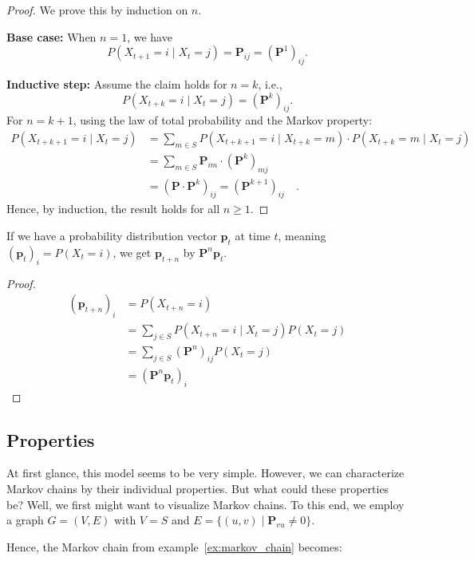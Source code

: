 \documentclass[../../main.tex]{subfiles}
\begin{document}
\begin{proof}
We prove this by induction on \( n \).

\textbf{Base case:} When \( n = 1 \), we have
\[
    P(X_{t+1} = i \mid X_t = j) = \bm{P}_{ij} = (\bm{P}^1)_{ij}.
\]

\textbf{Inductive step:} Assume the claim holds for \( n = k \), i.e.,
\[
    P(X_{t+k} = i \mid X_t = j) = (\bm{P}^k)_{ij}.
\]
For \( n = k+1 \), using the law of total probability and the Markov property:
\begin{align*}
    P(X_{t+k+1} = i \mid X_t = j) &= \sum_{m \in S} P(X_{t+k+1} = i \mid X_{t+k} = m) \cdot P(X_{t+k} = m \mid X_t = j) \\
    &= \sum_{m \in S} \bm{P}_{im} \cdot (\bm{P}^k)_{mj} \\
    &= (\bm{P} \cdot \bm{P}^k)_{ij} = (\bm{P}^{k+1})_{ij} \quad .
\end{align*}
Hence, by induction, the result holds for all \( n \geq 1 \).
\end{proof}

\begin{lemma}
    If we have a probability distribution vector $\bm{p}_t$ at time $t$, meaning $(\bm{p}_t)_i = P(X_t = i)$, we get $\bm{p}_{t+n}$ by $\bm{P}^n \bm{p}_t$.
\end{lemma}
\vspace{-2.5em}
\begin{proof}
    \begin{align*}
        (\bm{p}_{t+n})_i &= P(X_{t+n} = i) \\
        &= \sum_{j \in S} P(X_{t+n} = i \mid X_t = j) P(X_t = j) \\
        &= \sum_{j \in S} (\bm{P}^n)_{ij} P(X_t = j) \\
        &= (\bm{P}^n \bm{p}_t)_i
    \end{align*}
\end{proof}


\subsection{Properties}
At first glance, this model seems to be very simple. However, we can characterize Markov chains by their individual properties. But what could these properties be? Well, we first might want to visualize Markov chains. To this end, we employ a graph $G = (V, E)$ with $V = S$ and $E = \{(u, v) \mid \bm{P}_{vu} \neq 0\}$.

Hence, the Markov chain from example~\ref{ex:markov_chain} becomes:
\end{document}
